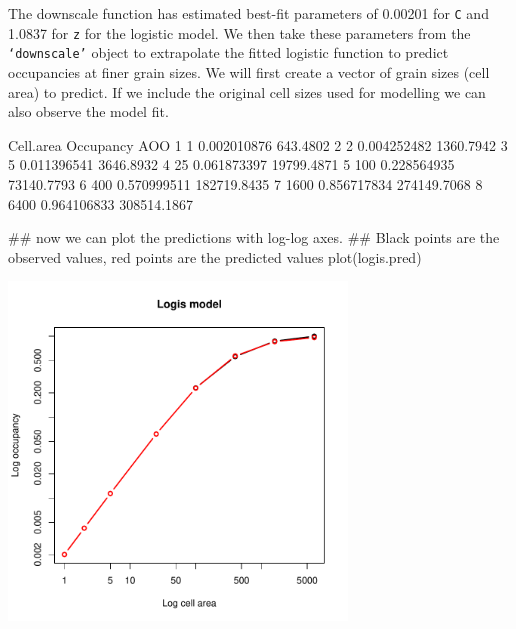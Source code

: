 \documentclass{article}[12pt, a4paper]
\begin{document}
The downscale function has estimated best-fit parameters of 0.00201 for \texttt{C} and 1.0837 for \texttt{z} for the logistic model. We then take these parameters from the \texttt{‘downscale’} object to extrapolate the fitted logistic function to predict occupancies at finer grain sizes. We will first create a vector of grain sizes (cell area) to predict. If we include the original cell sizes used for modelling we can also observe the model fit.

\begin{Schunk}
\begin{Soutput}
  Cell.area   Occupancy         AOO
1         1 0.002010876    643.4802
2         2 0.004252482   1360.7942
3         5 0.011396541   3646.8932
4        25 0.061873397  19799.4871
5       100 0.228564935  73140.7793
6       400 0.570999511 182719.8435
7      1600 0.856717834 274149.7068
8      6400 0.964106833 308514.1867
\end{Soutput}
\end{Schunk}
\begin{Schunk}
\begin{Sinput}
## now we can plot the predictions with log-log axes.
## Black points are the observed values, red points are the predicted values
plot(logis.pred)
\end{Sinput}
\end{Schunk}
{\centering 
\includegraphics[width=9cm]{Downscaling-downscale6} \par
}
\end{document}
